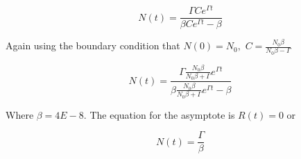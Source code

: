 \documentclass{article}
\begin{document}
$$N(t) = \frac{\Gamma  C e^{\Gamma t}}{\beta C e^{\Gamma t} - \beta}$$

Again using the boundary condition that $N(0) = N_0,$ $C = \frac{N_0 \beta}{N_0 \beta - \Gamma}$

\begin{equation}
    N(t) = \frac{\Gamma  \frac{N_0 \beta}{N_0 \beta + \Gamma} e^{\Gamma t}}{\beta \frac{N_0 \beta}{N_0 \beta + \Gamma} e^{\Gamma t} - \beta}
\end{equation}

Where $\beta = 4E-8.$ The equation for the asymptote is $R(t) = 0$ or

\begin{equation}
    N(t) = \frac{\Gamma}{\beta}
\end{equation}
\end{document}
